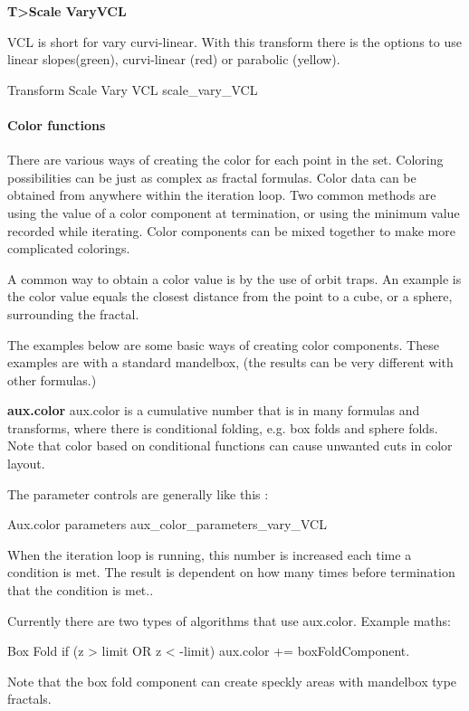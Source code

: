 \textbf{T>Scale VaryVCL}

VCL is short for vary curvi-linear. With this transform there is the options to use linear slopes(green), curvi-linear (red) or parabolic (yellow).

{Transform Scale Vary VCL}
{scale_vary_VCL}




\paragraph{Color functions}

There are various ways of creating the color for each point in the set. Coloring possibilities  can be just as complex as fractal formulas. Color data can be obtained from anywhere within the iteration loop. Two common methods are using the value of a color component at termination, or using the minimum value recorded while iterating. Color components can be mixed together to make more complicated colorings.

A common way to obtain a color value is by the use of orbit traps. An example is the color value equals the closest distance from the point to a cube, or a sphere, surrounding the fractal.

The examples below are some basic ways of creating color components. These examples are with a standard  mandelbox, (the results can be very different with other formulas.)


\textbf{aux.color}
aux.color is a cumulative number that is in many formulas and transforms,  where there is conditional folding, e.g. box folds and sphere folds. Note that color based on conditional functions can cause unwanted cuts in color layout.

The parameter controls are generally like this :

{Aux.color parameters}
{aux_color_parameters_vary_VCL}

When the iteration loop is running, this number is increased each time a condition is met.  The result is dependent on how many times before termination  that the condition is met..

Currently there are two types of algorithms that use aux.color.  Example maths:

Box Fold
if  (z  >  limit  OR  z  <   -limit)   aux.color +=  boxFoldComponent.

Note that the box fold component can create  speckly areas with mandelbox type fractals.

